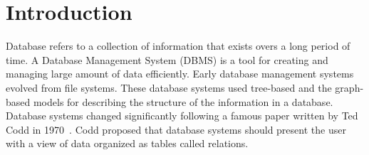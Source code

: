 \chapter{Introduction}
\label{chap:intro}

Database refers to a collection of information that exists overs a long period of time. A Database Management System (DBMS) is a tool for creating and managing large amount of data efficiently. Early database management systems evolved from file systems. These database systems used tree-based and the graph-based models for describing the structure of the information in a database. Database systems changed significantly following a famous paper written by Ted Codd in 1970~\cite{codd1970relational}. Codd proposed that database systems should present the user with a view of data organized as tables called relations.
